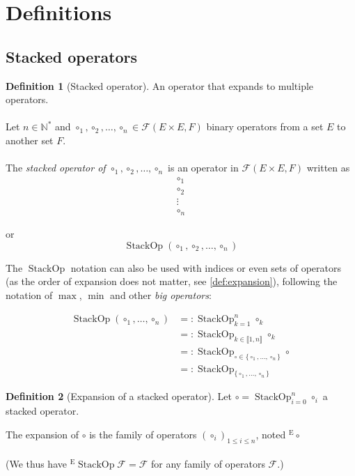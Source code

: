 \documentclass{article}
\newcommand{\fc}{\mathcal{F}}
\DeclareMathOperator*{\stackop}{StackOp}
\theoremstyle{definition}
\newtheorem{definition}{Definition}
\begin{document}
\section{Definitions}

\subsection{Stacked operators}

\begin{definition}[Stacked operator]
	An operator that expands to multiple operators.
	\paragraph{}
	Let $n\in \mathbb{N}^\ast$ and $\circ_1, \circ_2, \ldots, \circ_n \in \fc(E \times E, F)$ binary operators  from a set $E$ to another set $F$.

	\paragraph{}
	The \emph{stacked operator of $\circ_1, \circ_2, \ldots, \circ_n$} is an operator in $\fc(E \times E, F)$ written as
	\[
		\begin{matrix} \circ_1 \\ \circ_2 \\ \vdots \\ \circ_n \end{matrix} 
	\] 

	or \[
		\stackop(\circ_1, \circ_2, \ldots, \circ_n)
	\] 

	The $\stackop$ notation can also be used with indices or even sets of operators (as the order of expansion does not matter, see \ref{def:expansion}), following the notation of $\max$,  $\min$ and other  \emph{big operators}:

	\begin{align*}
		\stackop\left( \circ_1, \ldots, \circ_n \right) &=:  \stackop_{k=1}^n \circ_k \\
					&=: \stackop_{k\in \llbracket 1, n\rrbracket} \circ_k \\
					&=: \stackop_{\circ \in \{\circ_1, \ldots, \circ_n\} } \circ  \\
					&=: \stackop_{ \{\circ_1, \ldots, \circ_n\}  }
	\end{align*}
\end{definition}

\begin{definition}[Expansion of a stacked operator]
	Let $\circ = \stackop_{i=0}^n \circ_i$ a stacked operator.

	The expansion of $\circ$ is the family of operators  $(\circ_i)_{1\le i\le n}$, noted ${}^\text{E}\circ$
	
	\paragraph{}
	(We thus have ${}^\text{E}{\stackop} \fc = \fc$ for any family of operators $\fc$.)
\end{definition}
\end{document}
